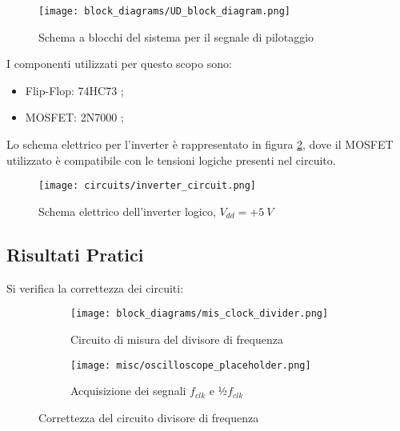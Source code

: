 \begin{figure}[H]
    \centering
    \texttt{[image: block\_diagrams/UD\_block\_diagram.png]}
    \caption{Schema a blocchi del sistema per il segnale di pilotaggio}
    \label{UD_block_diagram}
\end{figure}

I componenti utilizzati per questo scopo sono:

\begin{itemize}
    \item Flip-Flop: 74HC73 \cite{74hc73};
    \item MOSFET: 2N7000 \cite{2n7000};
\end{itemize}

Lo schema elettrico per l'inverter è rappresentato in figura \ref{inverter_circuit}, dove
il MOSFET utilizzato è compatibile con le tensioni logiche presenti nel circuito.

\begin{figure}[H]
    \centering
    \texttt{[image: circuits/inverter\_circuit.png]}
    \caption{Schema elettrico dell'inverter logico, $V_{dd}=+5\ V$}
    \label{inverter_circuit}
\end{figure}


\subsection*{Risultati Pratici}


Si verifica la correttezza dei circuiti:

\begin{figure}[H]
    \centering

    \begin{subfigure}{.5\textwidth}
        \centering
        \texttt{[image: block\_diagrams/mis\_clock\_divider.png]}
        \caption{Circuito di misura del divisore di frequenza}
        \label{mis_clock_divider}
    \end{subfigure}%
    \begin{subfigure}{.5\textwidth}
        \centering
        \texttt{[image: misc/oscilloscope\_placeholder.png]}
        \caption{Acquisizione dei segnali $f_{clk}$ e ½$f_{clk}$}
        \label{acq_clock_divider}
    \end{subfigure}

    \caption{Correttezza del circuito divisore di frequenza}
    \label{clock_divider}
\end{figure}

